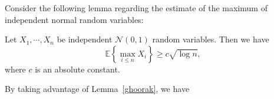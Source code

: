 \documentclass[12pt,draftcls,onecolumn]{IEEEtran}
\begin{document}

Consider the following lemma regarding the estimate 
of the maximum of independent normal random variables:
\begin{lemma}\cite[Section~2.5.2]{vershynin2018high}
\label{ghoorak}
Let $X_1,\cdots,X_n$ be independent $\mathcal{N}(0,1)$ random variables. Then we have
\begin{equation}
\label{B1_4}
\mathbb{E}\left\{\max_{i\leq n}X_i\right\}\geq c\sqrt{\log n},
\end{equation}
where $c$ is an absolute constant.
\end{lemma}
By taking advantage of Lemma~\ref{ghoorak}, we have
\end{document}

